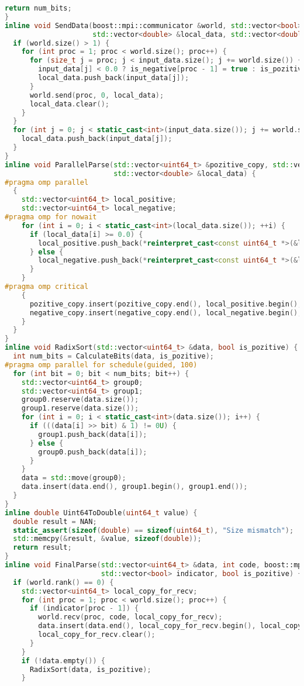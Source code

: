 \documentclass[a4paper,12pt]{article}
\begin{document}
\begin{lstlisting}[language=C++,
    breaklines=true,       % Автоматический перенос строк
    basicstyle=\small\ttfamily, % Уменьшенный шрифт
    columns=fullflexible ]
  return num_bits;
}
inline void SendData(boost::mpi::communicator &world, std::vector<bool> &is_pozitive, std::vector<bool> &is_negative,
                     std::vector<double> &local_data, std::vector<double> &input_data) {
  if (world.size() > 1) {
    for (int proc = 1; proc < world.size(); proc++) {
      for (size_t j = proc; j < input_data.size(); j += world.size()) {
        input_data[j] < 0.0 ? is_negative[proc - 1] = true : is_pozitive[proc - 1] = true;
        local_data.push_back(input_data[j]);
      }
      world.send(proc, 0, local_data);
      local_data.clear();
    }
  }
  for (int j = 0; j < static_cast<int>(input_data.size()); j += world.size()) {
    local_data.push_back(input_data[j]);
  }
}
inline void ParallelParse(std::vector<uint64_t> &pozitive_copy, std::vector<uint64_t> &negative_copy,
                          std::vector<double> &local_data) {
#pragma omp parallel
  {
    std::vector<uint64_t> local_positive;
    std::vector<uint64_t> local_negative;
#pragma omp for nowait
    for (int i = 0; i < static_cast<int>(local_data.size()); ++i) {
      if (local_data[i] >= 0.0) {
        local_positive.push_back(*reinterpret_cast<const uint64_t *>(&local_data[i]));
      } else {
        local_negative.push_back(*reinterpret_cast<const uint64_t *>(&local_data[i]));
      }
    }
#pragma omp critical
    {
      pozitive_copy.insert(pozitive_copy.end(), local_positive.begin(), local_positive.end());
      negative_copy.insert(negative_copy.end(), local_negative.begin(), local_negative.end());
    }
  }
}
inline void RadixSort(std::vector<uint64_t> &data, bool is_pozitive) {
  int num_bits = CalculateBits(data, is_pozitive);
#pragma omp parallel for schedule(guided, 100)
  for (int bit = 0; bit < num_bits; bit++) {
    std::vector<uint64_t> group0;
    std::vector<uint64_t> group1;
    group0.reserve(data.size());
    group1.reserve(data.size());
    for (int i = 0; i < static_cast<int>(data.size()); i++) {
      if (((data[i] >> bit) & 1) != 0U) {
        group1.push_back(data[i]);
      } else {
        group0.push_back(data[i]);
      }
    }
    data = std::move(group0);
    data.insert(data.end(), group1.begin(), group1.end());
  }
}
inline double Uint64ToDouble(uint64_t value) {
  double result = NAN;
  static_assert(sizeof(double) == sizeof(uint64_t), "Size mismatch");
  std::memcpy(&result, &value, sizeof(double));
  return result;
}
inline void FinalParse(std::vector<uint64_t> &data, int code, boost::mpi::communicator &world,
                       std::vector<bool> indicator, bool is_pozitive) {
  if (world.rank() == 0) {
    std::vector<uint64_t> local_copy_for_recv;
    for (int proc = 1; proc < world.size(); proc++) {
      if (indicator[proc - 1]) {
        world.recv(proc, code, local_copy_for_recv);
        data.insert(data.end(), local_copy_for_recv.begin(), local_copy_for_recv.end());
        local_copy_for_recv.clear();
      }
    }
    if (!data.empty()) {
      RadixSort(data, is_pozitive);
    }


\end{lstlisting}
\end{document}
